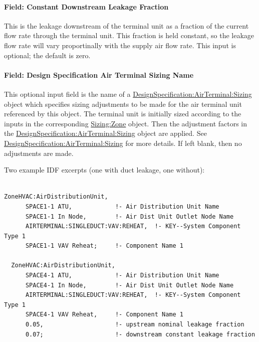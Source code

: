\paragraph{Field: Constant Downstream Leakage Fraction}\label{field-constant-downstream-leakage-fraction}

This is the leakage downstream of the terminal unit as a fraction of the current flow rate through the terminal unit. This fraction is held constant, so the leakage flow rate will vary proportinally with the supply air flow rate. This input is optional; the default is zero.

\paragraph{Field: Design Specification Air Terminal Sizing Name}\label{design-specification-air-terminal-sizing-name2}

This optional input field is the name of a \hyperref[designspecificationairterminalsizing]{DesignSpecification:AirTerminal:Sizing} object which specifies sizing adjustments to be made for the air terminal unit referenced by this object. The terminal unit is initially sized according to the inputs in the corresponding \hyperref[sizingzone]{Sizing:Zone} object. Then the adjustment factors in the \hyperref[designspecificationairterminalsizing]{DesignSpecification:AirTerminal:Sizing} object are applied. See \hyperref[designspecificationairterminalsizing]{DesignSpecification:AirTerminal:Sizing} for more details. If left blank, then no adjustments are made.

Two example IDF excerpts (one with duct leakage, one without):

\begin{lstlisting}

ZoneHVAC:AirDistributionUnit,
      SPACE1-1 ATU,            !- Air Distribution Unit Name
      SPACE1-1 In Node,        !- Air Dist Unit Outlet Node Name
      AIRTERMINAL:SINGLEDUCT:VAV:REHEAT,  !- KEY--System Component Type 1
      SPACE1-1 VAV Reheat;     !- Component Name 1

  ZoneHVAC:AirDistributionUnit,
      SPACE4-1 ATU,            !- Air Distribution Unit Name
      SPACE4-1 In Node,        !- Air Dist Unit Outlet Node Name
      AIRTERMINAL:SINGLEDUCT:VAV:REHEAT,  !- KEY--System Component Type 1
      SPACE4-1 VAV Reheat,     !- Component Name 1
      0.05,                    !- upstream nominal leakage fraction
      0.07;                    !- downstream constant leakage fraction
\end{lstlisting}

